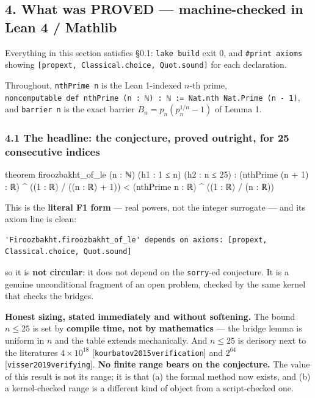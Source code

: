 \documentclass[
  a4paper,
  11pt]{article}
\newenvironment{Shaded}{}{}
\newcommand{\NormalTok}[1]{#1}
\begin{document}
\subsection{4. What was PROVED --- machine-checked in Lean 4 /
Mathlib}\label{4-what-was-proved--machine-checked-in-lean-4--mathlib}

Everything in this section satisfies §0.1: \texttt{lake\ build} exit 0,
and \texttt{\#print\ axioms} showing
\texttt{{[}propext,\ Classical.choice,\ Quot.sound{]}} for each
declaration.

Throughout, \texttt{nthPrime\ n} is the Lean 1-indexed \(n\)-th prime,
\texttt{noncomputable\ def\ nthPrime\ (n\ :\ ℕ)\ :\ ℕ\ :=\ Nat.nth\ Nat.Prime\ (n\ -\ 1)},
and \texttt{barrier\ n} is the exact barrier \(B_n = p_n(p_n^{1/n}-1)\)
of Lemma 1.

\subsubsection{4.1 The headline: the conjecture, proved outright, for 25
consecutive
indices}\label{41-the-headline-the-conjecture-proved-outright-for-25-consecutive-indices}

\begin{Shaded}
\begin{Highlighting}[]
\NormalTok{theorem firoozbakht\_of\_le (n : ℕ) (h1 : 1 ≤ n) (h2 : n ≤ 25) :}
\NormalTok{    (nthPrime (n + 1) : ℝ) \^{} ((1 : ℝ) / ((n : ℝ) + 1)) \textless{}}
\NormalTok{      (nthPrime n : ℝ) \^{} ((1 : ℝ) / (n : ℝ))}
\end{Highlighting}
\end{Shaded}

This is the \textbf{literal F1 form} --- real powers, not the integer
surrogate --- and its axiom line is clean:

\begin{verbatim}
'Firoozbakht.firoozbakht_of_le' depends on axioms: [propext, Classical.choice, Quot.sound]
\end{verbatim}

so it is \textbf{not circular}: it does not depend on the
\texttt{sorry}-ed conjecture. It is a genuine unconditional fragment of
an open problem, checked by the same kernel that checks the bridges.

\textbf{Honest sizing, stated immediately and without softening.} The
bound \(n \le 25\) is set by \textbf{compile time, not by mathematics}
--- the bridge lemma is uniform in \(n\) and the table extends
mechanically. And \(n \le 25\) is derisory next to the
literature\textquotesingle s \(4\times10^{18}\)
{[}\texttt{kourbatov2015verification}{]} and \(2^{64}\)
{[}\texttt{visser2019verifying}{]}. \textbf{No finite range bears on the
conjecture.} The value of this result is not its range; it is that (a)
the formal method now exists, and (b) a kernel-checked range is a
different kind of object from a script-checked one.
\end{document}
